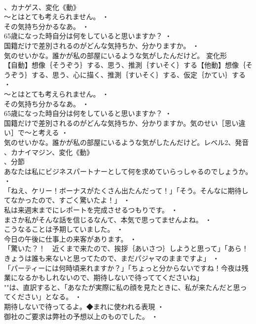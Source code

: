\documentclass[8pt]{extreport}
\begin{document}
\begin{CJK}{UTF8}{min}
\\	、カナゲス、変化《動》
\\	～とはとても考えられません。 ・
\\	その気持ち分かるなあ。 ・
\\	65歳になった時自分は何をしていると思いますか？ ・
\\	国籍だけで差別されるのがどんな気持ちか、分かりますか。 ・
\\	気のせいかな。誰かが私の部屋にいるような気がしたんだけど。	変化形 
\\	【自動】想像｛そうぞう｝する、思う、推測｛すいそく｝する【他動】想像｛そうぞう｝する、思う、心に描く、推測｛すいそく｝する、仮定｛かてい｝する ・
\\	～とはとても考えられません。 ・
\\	その気持ち分かるなあ。 ・
\\	65歳になった時自分は何をしていると思いますか？ ・
\\	国籍だけで差別されるのがどんな気持ちか、分かりますか。気のせい［思い違い］で～と考える ・
\\	気のせいかな。誰かが私の部屋にいるような気がしたんだけど。レベル2、発音
\\	、カナイマジン、変化《動》
\\	、分節
\\	あなたは私にビジネスパートナーとして何を求めていらっしゃるのでしょうか。 ・
\\	「ねえ、ケリー！ボーナスがたくさん出たんだって！」「そう。そんなに期待してなかったので、すごく驚いたよ！」 ・
\\	私は来週末までにレポートを完成させるつもりです。 ・
\\	まさか私がそんな話を信じるなんて、本気で思ってませんよね。 ・
\\	こうなることは予期していました。 ・
\\	今日の午後に仕事上の来客があります。 ・
\\	「驚いた？！　近くまで来たので、挨拶｛あいさつ｝しようと思って」「あら！きょうは誰も来ないと思ってたので、まだパジャマのままですよ」 ・
\\	「パーティーには何時頃来れますか？」「ちょっと分からないですね！今夜は残業になるかもしれないので、期待しないで待っててくださいね」
\\	""は、直訳すると、「あなたが実際に私の顔を見たときに、私が来たんだと思ってください」となる。 ・
\\	期待しないで待ってるよ。◆まれに使われる表現 ・
\\	御社のご要求は弊社の予想以上のものでした。 ・

\end{CJK}
\end{document}
